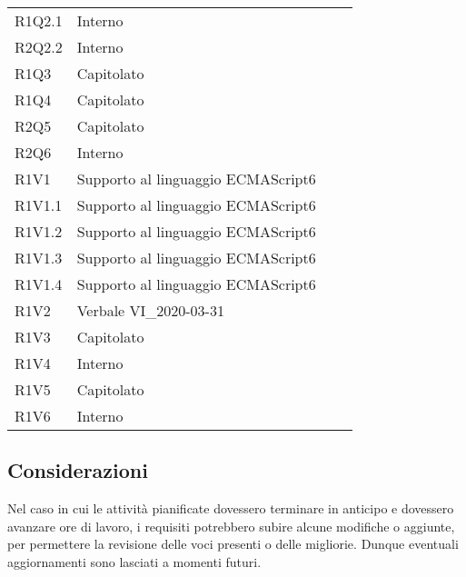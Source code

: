 \begin{longtable}{C{3cm} C{3cm} L{5.5cm} C{3cm}}
R1Q2.1 & Interno\\
R2Q2.2 & Interno\\
R1Q3 & Capitolato\\
R1Q4 & Capitolato\\
R2Q5 & Capitolato\\
R2Q6 & Interno\\
R1V1 & Supporto al linguaggio ECMAScript6\\
R1V1.1 & Supporto al linguaggio ECMAScript6\\
R1V1.2 & Supporto al linguaggio ECMAScript6\\
R1V1.3 & Supporto al linguaggio ECMAScript6\\
R1V1.4 & Supporto al linguaggio ECMAScript6\\
R1V2 & Verbale VI\_2020-03-31\\
R1V3 & Capitolato\\
R1V4 & Interno\\
R1V5 & Capitolato\\
R1V6 & Interno\\
\end{longtable}
	

	\subsection{Considerazioni}
Nel caso in cui le attività pianificate dovessero terminare in anticipo e dovessero avanzare ore di lavoro, i requisiti potrebbero subire alcune modifiche o aggiunte, per permettere la revisione delle voci presenti o delle migliorie. Dunque eventuali aggiornamenti sono lasciati a momenti
futuri.


